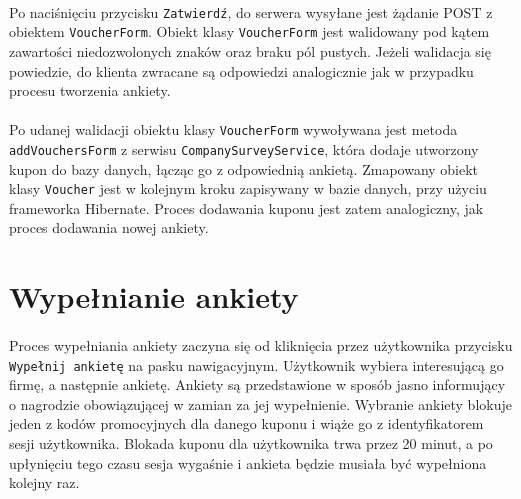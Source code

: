\paragraph{}
Po naciśnięciu przycisku \texttt{Zatwierdź}, do serwera wysyłane jest żądanie POST z obiektem \texttt{VoucherForm}. Obiekt klasy \texttt{VoucherForm} jest walidowany pod kątem zawartości niedozwolonych znaków oraz braku pól pustych. Jeżeli walidacja się powiedzie, do klienta zwracane są odpowiedzi analogicznie jak w przypadku procesu tworzenia ankiety.

\paragraph{}
Po udanej walidacji obiektu klasy \texttt{VoucherForm} wywoływana jest metoda \texttt{addVouchersForm} z serwisu \texttt{CompanySurveyService}, która dodaje utworzony kupon do bazy danych, łącząc go z odpowiednią ankietą. Zmapowany obiekt klasy \texttt{Voucher} jest w kolejnym kroku zapisywany w bazie danych, przy użyciu frameworka Hibernate. Proces dodawania kuponu jest zatem analogiczny, jak proces dodawania nowej ankiety.



\section{Wypełnianie ankiety}
\paragraph{}
Proces wypełniania ankiety zaczyna się od kliknięcia przez użytkownika przycisku \texttt{Wypełnij ankietę} na pasku nawigacyjnym. Użytkownik wybiera interesującą go firmę, a następnie ankietę. Ankiety są przedstawione w sposób jasno informujący o nagrodzie obowiązującej w zamian za jej wypełnienie. Wybranie ankiety blokuje jeden z kodów promocyjnych dla danego kuponu i wiąże go z identyfikatorem sesji użytkownika. Blokada kuponu dla użytkownika trwa przez 20 minut, a po upłynięciu tego czasu sesja wygaśnie i ankieta będzie musiała być wypełniona kolejny raz. 

